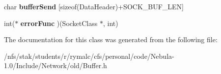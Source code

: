 \begin{DoxyCompactItemize}
\item 
\hypertarget{classNetwork_1_1Buffer_a16ec7619d942a8d5adfd5af907231240}{
char {\bfseries bufferSend} \mbox{[}sizeof(DataHeader)+SOCK\_\-BUF\_\-LEN\mbox{]}}
\label{classNetwork_1_1Buffer_a16ec7619d942a8d5adfd5af907231240}

\item 
\hypertarget{classNetwork_1_1Buffer_af918a81b209d786c8bc1aa8d6d1a41f1}{
int($\ast$ {\bfseries errorFunc} )(SocketClass $\ast$, int)}
\label{classNetwork_1_1Buffer_af918a81b209d786c8bc1aa8d6d1a41f1}

\end{DoxyCompactItemize}


The documentation for this class was generated from the following file:\begin{DoxyCompactItemize}
\item 
/nfs/stak/students/r/rymalc/cfs/personal/code/Nebula-\/1.0/Include/Network/old/Buffer.h\end{DoxyCompactItemize}
